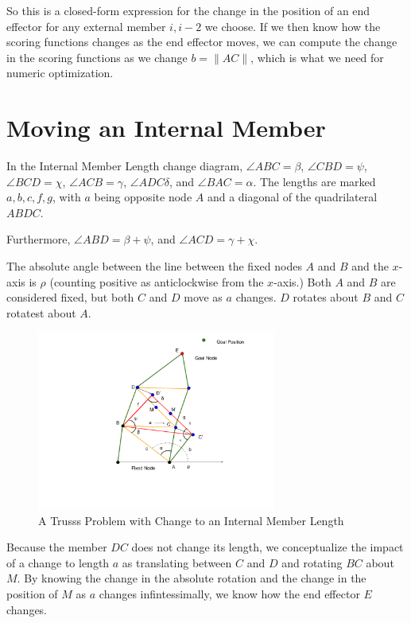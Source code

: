 \documentclass[11pt]{article}
\begin{document}
So this is a closed-form expression for the change in the position of an end effector for any external member $i,i-2$ we choose. If we then know how the
scoring functions changes as the end effector moves, we can compute the change in the scoring functions as we change $b = \| AC \|$, which is what
we need for numeric optimization.

\section{Moving an Internal Member}


In the Internal Member Length change diagram, $\angle ABC = \beta $, $\angle CBD = \psi$, $\angle BCD = \chi$,
$\angle ACB = \gamma$, $\angle ADC \delta$, and $\angle BAC = \alpha$. The lengths are marked $a,b,c,f,g$, with $a$ being opposite node $A$ and a diagonal
of the quadrilateral $ABDC$.




Furthermore, $\angle ABD = \beta + \psi$, and $\angle ACD = \gamma + \chi$.

The absolute angle between the line between the fixed nodes $A$ and $B$ and the $x$-axis is $\rho$ (counting positive as anticlockwise from the $x$-axis.)
Both $A$ and $B$ are considered fixed, but both $C$ and $D$ move as $a$ changes. $D$ rotates about $B$ and $C$ rotatest about $A$.

\begin{figure}
  \centering
  \includegraphics[width=0.7\textwidth]{Internal_angle_change.png}
  \caption{A Trusss Problem with Change to an Internal Member Length}  
\end{figure}


Because the member $DC$ does not change its length, we conceptualize the impact of a change to length $a$ as translating  between $C$ and $D$ and
rotating $BC$ about $M$. By knowing the change in the absolute rotation and the change in the position of $M$ as $a$ changes infintessimally, we know how the
end effector $E$ changes.
\end{document}

